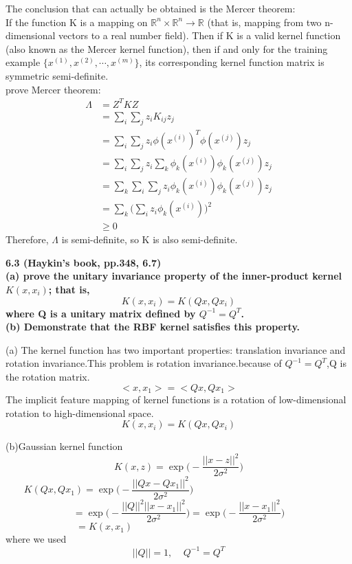 \noindent The conclusion that can actually be obtained is the Mercer theorem:\\
If the function K is a mapping on $\mathbb{R}^n \times \mathbb{R}^n \rightarrow \mathbb{R}$ (that is, mapping from two n-dimensional vectors to a real number field). Then if K is a valid kernel function (also known as the Mercer kernel function), then if and only for the training example $\{x^{(1)},x^{(2)},\cdots,x^{(m)}\}$, its corresponding kernel function matrix is symmetric semi-definite.\\
prove Mercer theorem:
\begin{align}
\Lambda&=Z^TKZ\nonumber\\
&=\sum_i\sum_jz_iK_{ij}z_j\nonumber\\
&=\sum_i\sum_jz_i\phi(x^{(i)})^T\phi(x^{(j)})z_j\nonumber\\
&=\sum_i\sum_jz_i\sum_k\phi_k(x^{(i)})\phi_k(x^{(j)})z_j\nonumber\\
&=\sum_k\sum_i\sum_jz_i\phi_k(x^{(i)})\phi_k(x^{(j)})z_j\nonumber\\
&=\sum_k\Big(\sum_iz_i\phi_k(x^{(i)})\Big)^2\nonumber\\
&\geq 0 \nonumber
\end{align}
Therefore, $\Lambda$ is semi-definite, so K is also semi-definite.

\noindent \textbf{6.3 (Haykin’s book, pp.348, 6.7) \\(a) prove the unitary invariance property of the inner-product kernel
$K(x,x_i)$; that is,
$$K(x,x_i)=K(Qx,Qx_i)$$
where Q is a unitary matrix defined by $Q^{-1}=Q^T$.\\
(b) Demonstrate that the RBF kernel satisfies this property.}

\noindent(a) The kernel function has two important properties: translation invariance and rotation invariance.This problem is rotation invariance.because of $Q^{-1}=Q^T$,Q is the rotation matrix.
$$<x,x_1> = <Qx,Qx_1>$$
The implicit feature mapping of kernel functions is a rotation of low-dimensional rotation to high-dimensional space.
$$K(x,x_i)=K(Qx,Qx_i)$$

\noindent(b)Gaussian kernel function $$K(x,z)=\exp\Big(-\frac{||x-z||^2}{2\sigma^2}\Big)$$
$$K(Qx,Qx_1)=\exp\Big(-\frac{||Qx-Qx_1||^2}{2\sigma^2}\Big)~~~~~~~~~~~~~~~~~~~~~~~~~~~~~~~~~~~~~~~~~~~~~~~~~~~~~~~~~~~~~~~~~~$$
$$=\exp\Big(-\frac{||Q||^2||x-x_1||^2}{2\sigma^2}\Big)=\exp\Big(-\frac{||x-x_1||^2}{2\sigma^2}\Big)$$
$$=K(x,x_1)~~~~~~~~~~~~~~~~~~~~~~~~~~~~~~~~~~~~~~~~~~~~~~~~~~~~~~~~~~~~~~~~~~~~~~$$
where we used $$||Q|| = 1,~~~~~Q^{-1} = Q^T$$


